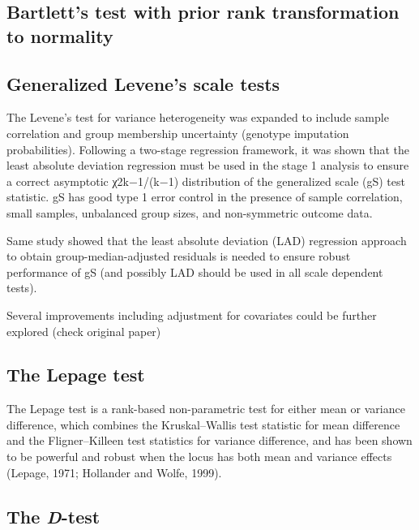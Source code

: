 \documentclass[
]{book}
\begin{document}
\hypertarget{bartletts-test-with-prior-rank-transformation-to-normality}{%
\subsection{Bartlett's test with prior rank transformation to normality}\label{bartletts-test-with-prior-rank-transformation-to-normality}}

\hypertarget{generalized-levenes-scale-tests}{%
\subsection{Generalized Levene's scale tests}\label{generalized-levenes-scale-tests}}

The Levene's test for variance heterogeneity was expanded to include sample correlation and group membership uncertainty (genotype imputation probabilities). Following a two-stage regression framework, it was shown that the least absolute deviation regression must be used in the stage 1 analysis to ensure a correct asymptotic χ2k−1/(k−1) distribution of the generalized scale (gS) test statistic.
gS has good type 1 error control in the presence of sample correlation, small samples, unbalanced group sizes, and non-symmetric outcome data.

Same study showed that the least absolute deviation (LAD) regression approach to obtain group-median-adjusted residuals is needed to ensure robust performance of gS (and possibly LAD should be used in all scale dependent tests).

Several improvements including adjustment for covariates could be further explored (check original paper)

\hypertarget{the-lepage-test}{%
\subsection{The Lepage test}\label{the-lepage-test}}

The Lepage test is a rank-based non-parametric test for either mean or variance difference, which combines the Kruskal--Wallis test statistic for mean difference and the Fligner--Killeen test statistics for variance difference, and has been shown to be powerful and robust when the locus has both mean and variance effects (Lepage, 1971; Hollander and Wolfe, 1999).

\hypertarget{the-d-test}{%
\subsection{\texorpdfstring{The \emph{D}-test}{The D-test}}\label{the-d-test}}
\end{document}
